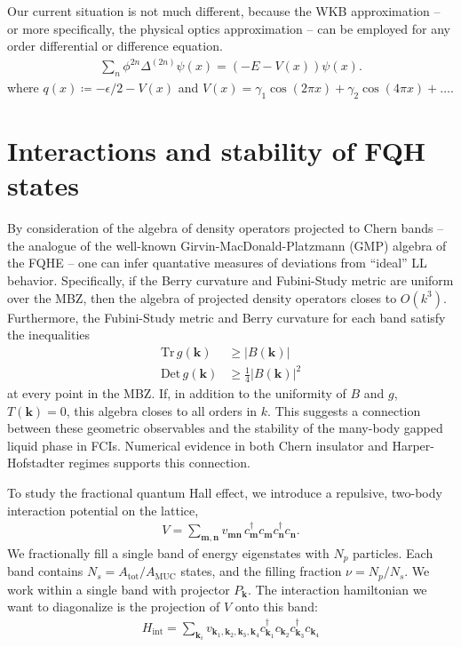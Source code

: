 \documentclass[aps,prb,twocolumn,letterpaper,twoside,nobalancelastpage,groupedaddress,amsmath,amssymb,floatfix,citeautoscript]{revtex4-1}
\begin{document}
Our current situation is not much different, because the WKB approximation -- or more specifically, the physical optics approximation -- can be employed for any order differential or difference equation.
\begin{align*}
\sum_{n}\phi^{2n}\Delta^{(2n)}\psi(x) = (- E - V(x))\psi(x).
\end{align*}
where $q(x) \coloneqq -\epsilon/2 - V(x)$ and $V(x) = \gamma_1 \cos(2\pi x) + \gamma_2 \cos(4\pi x) + \ldots$.

\section{Interactions and stability of FQH states}
By consideration of the algebra of density operators projected to Chern bands -- the analogue of the well-known Girvin-MacDonald-Platzmann (GMP) algebra of the FQHE \cite{Girvin:1986bu} -- one can infer quantative measures of deviations from ``ideal'' LL behavior\cite{parameswaran_fractional_2012,roy_band_2014}. Specifically, if the Berry curvature and Fubini-Study metric are uniform over the MBZ, then the algebra of projected density operators closes to $O(k^3)$. Furthermore, the Fubini-Study metric and Berry curvature for each band satisfy the inequalities\cite{roy_band_2014}
\begin{align}
\label{band-geom-ineq}
\text{Tr}\,g(\mathbf{k})&\geq|B(\mathbf{k})| \\
\text{Det}\,g(\mathbf{k})&\geq\frac{1}{4}|B(\mathbf{k})|^2 
\end{align}
at every point in the MBZ. If, in addition to the uniformity of $B$ and $g$, $T(\mathbf{k})=0$, this algebra closes to all orders in $k$. This suggests a connection between these geometric observables and the stability of the many-body gapped liquid phase in FCIs. Numerical evidence in both Chern insulator\cite{jackson_geometric_2015} and Harper-Hofstadter\cite{bauer_quantum_2016} regimes supports this connection.

To study the fractional quantum Hall effect, we introduce a repulsive, two-body interaction potential on the lattice,
\begin{align*}
V = \sum_{\mathbf{m},\mathbf{n}}v_{\mathbf{m}\mathbf{n}}\, c^{\dag}_\mathbf{m} c_\mathbf{m} c^{\dag}_\mathbf{n} c_\mathbf{n}.
\end{align*}
We fractionally fill a single band of energy eigenstates with $N_p$ particles. Each band contains $N_s = A_{\text{tot}}/A_{\text{MUC}}$ states, and the filling fraction $\nu = N_p /N_s$. We work within a single band with projector $P_{\mathbf{k}}$. The interaction hamiltonian we want to diagonalize is the projection of $V$ onto this band:
\begin{align*}
H_{\text{int}} = \sum_{{\mathbf{k}_i}} v_{\mathbf{k}_1,\mathbf{k}_2,\mathbf{k}_3,\mathbf{k}_4}c^{\dag}_{\mathbf{k}_1} c_{\mathbf{k}_2} c^{\dag}_{\mathbf{k}_3} c_{\mathbf{k}_4}
\end{align*}
\end{document}
